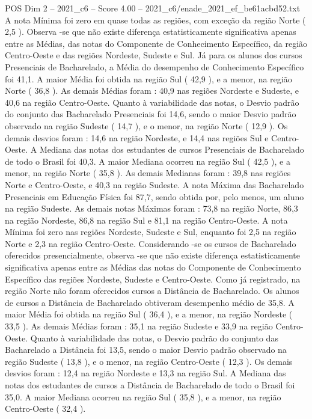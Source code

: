 \begin{textsample}{POS Dim 2 – 2021\_c6 – Score 4.00 – 2021\_c6/enade\_2021\_ef\_be61acbd52.txt}
A nota Mínima foi zero em quase todas as regiões, com exceção da região Norte ( 2,5 ).
Observa -se que não existe diferença estatisticamente significativa apenas entre as Médias, das notas do Componente de Conhecimento Específico, da região Centro-Oeste e das regiões Nordeste, Sudeste e Sul.
Já para os alunos dos cursos Presenciais de Bacharelado, a Média do desempenho de Conhecimento Específico foi 41,1.
A maior Média foi obtida na região Sul ( 42,9 ), e a menor, na região Norte ( 36,8 ).
As demais Médias foram : 40,9 nas regiões Nordeste e Sudeste, e 40,6 na região Centro-Oeste.
Quanto à variabilidade das notas, o Desvio padrão do conjunto das Bacharelado Presenciais foi 14,6, sendo o maior Desvio padrão observado na região Sudeste ( 14,7 ), e o menor, na região Norte ( 12,9 ).
Os demais desvios foram : 14,6 na região Nordeste, e 14,4 nas regiões Sul e Centro-Oeste.
A Mediana das notas dos estudantes de cursos Presenciais de Bacharelado de todo o Brasil foi 40,3.
A maior Mediana ocorreu na região Sul ( 42,5 ), e a menor, na região Norte ( 35,8 ).
As demais Medianas foram : 39,8 nas regiões Norte e Centro-Oeste, e 40,3 na região Sudeste.
A nota Máxima das Bacharelado Presenciais em Educação Física foi 87,7, sendo obtida por, pelo menos, um aluno na região Sudeste.
As demais notas Máximas foram : 73,8 na região Norte, 86,3 na região Nordeste, 86,8 na região Sul e 81,1 na região Centro-Oeste.
A nota Mínima foi zero nas regiões Nordeste, Sudeste e Sul, enquanto foi 2,5 na região Norte e 2,3 na região Centro-Oeste.
Considerando -se os cursos de Bacharelado oferecidos presencialmente, observa -se que não existe diferença estatisticamente significativa apenas entre as Médias das notas do Componente de Conhecimento Específico das regiões Nordeste, Sudeste e Centro-Oeste.
Como já registrado, na região Norte não foram oferecidos cursos a Distância de Bacharelado.
Os alunos de cursos a Distância de Bacharelado obtiveram desempenho médio de 35,8.
A maior Média foi obtida na região Sul ( 36,4 ), e a menor, na região Nordeste ( 33,5 ).
As demais Médias foram : 35,1 na região Sudeste e 33,9 na região Centro-Oeste.
Quanto à variabilidade das notas, o Desvio padrão do conjunto das Bacharelado a Distância foi 13,5, sendo o maior Desvio padrão observado na região Sudeste ( 13,8 ), e o menor, na região Centro-Oeste ( 12,3 ).
Os demais desvios foram : 12,4 na região Nordeste e 13,3 na região Sul.
A Mediana das notas dos estudantes de cursos a Distância de Bacharelado de todo o Brasil foi 35,0.
A maior Mediana ocorreu na região Sul ( 35,8 ), e a menor, na região Centro-Oeste ( 32,4 ).

\end{textsample}

